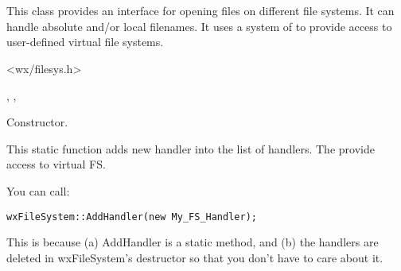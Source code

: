 %
%

\section{}\label{wxfilesystem}

This class provides an interface for opening files on different
file systems. It can handle absolute and/or local filenames.
It uses a system of  to
provide access to user-defined virtual file systems.




<wx/filesys.h>


, 
, 



\label{wxfilesystemwxfilesystem}


Constructor. 


\label{wxfilesystemaddhandler}


This static function adds new handler into the list of handlers.
The  provide access to virtual FS.


You can call:

\begin{verbatim}
wxFileSystem::AddHandler(new My_FS_Handler);
\end{verbatim}

This is because (a) AddHandler is a static method, and (b) the handlers
are deleted in wxFileSystem's destructor so that you don't have to
care about it.


\label{wxfilesystemchangepathto}


